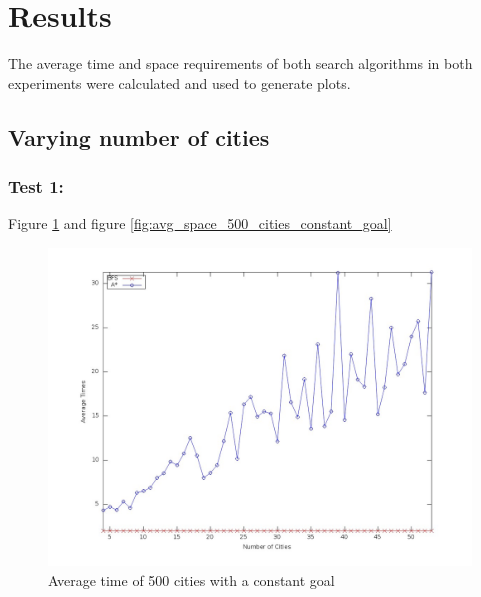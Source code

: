 \documentclass[letterpaper]{article}
\begin{document}
\section{Results}
The average time and
space requirements of both search algorithms in both experiments were calculated and used to generate
plots.
\subsection{Varying number of cities}
\subsubsection{Test 1:}
Figure \ref{fig:avg_time_500_cities_constant_goal} and figure \ref{fig:avg_space_500_cities_constant_goal}

\begin{figure}[!htb]
	\centering
	\includegraphics[scale=0.22]{./pics/avg_time_500_cities_constant_goal.jpg}
	\caption{Average time of 500 cities with a constant goal}
	\label{fig:avg_time_500_cities_constant_goal}
\end{figure}
\end{document}

